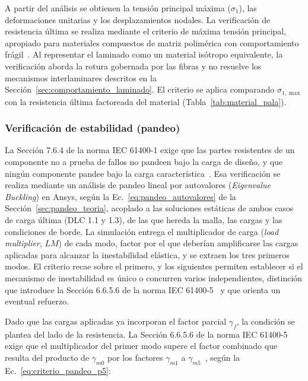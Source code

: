 A partir del análisis se obtienen la tensión principal máxima ($\sigma_1$), las deformaciones unitarias y los desplazamientos nodales. La verificación de resistencia última se realiza mediante el criterio de máxima tensión principal, apropiado para materiales compuestos de matriz polimérica con comportamiento frágil~\parencite{Moraras2023}. Al representar el laminado como un material isótropo equivalente, la verificación aborda la rotura gobernada por las fibras y no resuelve los mecanismos interlaminares descritos en la Sección~\ref{sec:comportamiento_laminado}. El criterio se aplica comparando $\sigma_{1,\max}$ con la resistencia última factoreada del material (Tabla~\ref{tab:material_pala}).

\subsubsection{Verificación de estabilidad (pandeo)}
\label{sec:pandeo_met}

La Sección 7.6.4 de la norma IEC 61400-1 exige que las partes resistentes de un componente no a prueba de fallos no pandeen bajo la carga de diseño, y que ningún componente pandee bajo la carga característica~\parencite*{IEC61400-1}. Esa verificación se realiza mediante un análisis de pandeo lineal por autovalores (\textit{Eigenvalue Buckling}) en Ansys, según la Ec.~\ref{eq:pandeo_autovalores} de la Sección~\ref{sec:pandeo_teoria}, acoplado a las soluciones estáticas de ambos casos de carga última (DLC 1.1 y 1.3), de las que hereda la malla, las cargas y las condiciones de borde. La simulación entrega el multiplicador de carga (\textit{load multiplier}, $LM$) de cada modo, factor por el que deberían amplificarse las cargas aplicadas para alcanzar la inestabilidad elástica, y se extraen los tres primeros modos. El criterio recae sobre el primero, y los siguientes permiten establecer si el mecanismo de inestabilidad es único o concurren varios independientes, distinción que introduce la Sección 6.6.5.6 de la norma IEC 61400-5~\parencite*{IEC61400-5} y que orienta un eventual refuerzo.

Dado que las cargas aplicadas ya incorporan el factor parcial $\gamma_f$, la condición se plantea del lado de la resistencia. La Sección 6.6.5.6 de la norma IEC 61400-5 exige que el multiplicador del primer modo supere el factor combinado que resulta del producto de $\gamma_{m0}$ por los factores $\gamma_{m1}$ a $\gamma_{m5}$~\parencite*{IEC61400-5}, según la Ec.~\ref{eq:criterio_pandeo_p5}:

